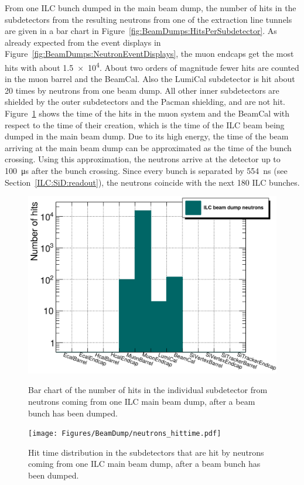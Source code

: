 From one ILC bunch dumped in the main beam dump, the number of hits in the \sid subdetectors from the resulting neutrons from one of the extraction line tunnels are given in a bar chart in Figure~\ref{fig:BeamDumps:HitsPerSubdetector}.
As already expected from the event displays in Figure~\ref{fig:BeamDumps:NeutronEventDisplays}, the \sid muon endcaps get the most hits with about \num{1.5e4}.
About two orders of magnitude fewer hits are counted in the muon barrel and the BeamCal.
Also the LumiCal subdetector is hit about \num{20} times by neutrons from one beam dump.
All other inner \sid subdetectors are shielded by the outer subdetectors and the Pacman shielding, and are not hit.
\\Figure~\ref{fig:BeamDumps:HitTime} shows the time of the hits in the \sid muon system and the BeamCal with respect to the time of their creation, which is the time of the ILC beam being dumped in the main beam dump.
Due to its high energy, the time of the beam arriving at the main beam dump can be approximated as the time of the bunch crossing.
Using this approximation, the neutrons arrive at the \sid detector up to \SI{100}{\micro\second} after the bunch crossing.
Since every bunch is separated by \SI{554}{\nano\second} (see Section~\ref{ILC:SiD:readout}), the neutrons coincide with the next 180 ILC bunches.
\begin{figure}[!h]
\centering
\begin{minipage}[t]{0.49\textwidth}
\centering
 \includegraphics[width=\textwidth]{Figures/BeamDump/Hits_in_SiD_subdetectors.png}
\caption[Number of hits in the \sid subdetectors of the ILC main beam dump neutrons]{Bar chart of the number of hits in the individual \sid subdetector from neutrons coming from one ILC main beam dump, after a beam bunch has been dumped.}
\label{fig:BeamDumps:HitsPerSubdetector}
\end{minipage}
\hfill
\begin{minipage}[t]{0.49\textwidth}
\centering
 \texttt{[image: Figures/BeamDump/neutrons\_hittime.pdf]}
\caption[Neutron hit time in the \sid subdetectors]{Hit time distribution in the \sid subdetectors that are hit by neutrons coming from one ILC main beam dump, after a beam bunch has been dumped.}
\label{fig:BeamDumps:HitTime}
\end{minipage}
\end{figure}
